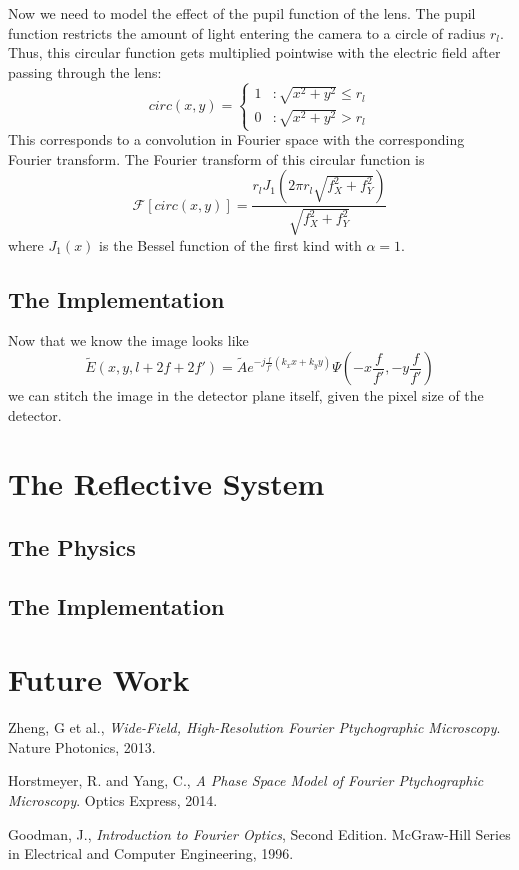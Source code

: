 \documentclass[11pt,a4paper,journal]{IEEEtran}
\begin{document}
Now we need to model the effect of the pupil function of the lens. The pupil function restricts the amount of light entering the camera to a circle of radius $r_{l}$. Thus, this circular function gets multiplied pointwise with the electric field after passing through the lens:
\begin{equation}
circ(x, y) = \left\{
  \begin{array}{lr}
    1 & : \sqrt{x^2 + y^2} \le r_{l} \\
    0 & : \sqrt{x^2 + y^2} > r_{l}
  \end{array}
\right.
\end{equation}
This corresponds to a convolution in Fourier space with the corresponding Fourier transform. The Fourier transform of this circular function is
\begin{equation}
\mathcal{F}[circ(x, y)] = \frac{r_{l} J_1(2\pi r_l \sqrt{f_X ^2 + f_Y ^2})}{\sqrt{f_X ^2 + f_Y ^2}}
\end{equation}
where $J_1(x)$ is the Bessel function of the first kind with $\alpha=1$.

\subsection{The Implementation}
Now that we know the image looks like 
\begin{equation*}
\tilde{E}(x, y, l+2f+2f') = \tilde{A} e^{-j\frac{f}{f'}\left(k_x x + k_y y\right)} \Psi\left(-x\frac{f}{f'}, -y\frac{f}{f'}\right)
\end{equation*}
we can stitch the image in the detector plane itself, given the pixel size of the detector.

\section{The Reflective System}
\subsection{The Physics}
\subsection{The Implementation}

\section{Future Work}

\begin{thebibliography}{10}

  Zheng, G et al.,
  \emph{Wide-Field, High-Resolution Fourier Ptychographic Microscopy}.
  Nature Photonics,
  2013.
  
  Horstmeyer, R. and Yang, C.,
  \emph{A Phase Space Model of Fourier Ptychographic Microscopy}.
  Optics Express,
  2014.
  
  Goodman, J.,
  \emph{Introduction to Fourier Optics}, Second Edition.
  McGraw-Hill Series in Electrical and Computer Engineering,
  1996.
  
\end{thebibliography}
\end{document}
